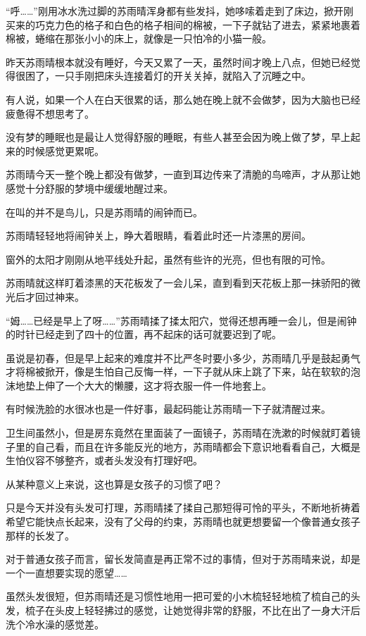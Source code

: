 “呼……”刚用冰水洗过脚的苏雨晴浑身都有些发抖，她哆嗦着走到了床边，掀开刚买来的巧克力色的格子和白色的格子相间的棉被，一下子就钻了进去，紧紧地裹着棉被，蜷缩在那张小小的床上，就像是一只怕冷的小猫一般。

昨天苏雨晴根本就没有睡好，今天又累了一天，虽然时间才晚上八点，但她已经觉得很困了，一只手刚把床头连接着灯的开关关掉，就陷入了沉睡之中。

有人说，如果一个人在白天很累的话，那么她在晚上就不会做梦，因为大脑也已经疲惫得不想思考了。

没有梦的睡眠也是最让人觉得舒服的睡眠，有些人甚至会因为晚上做了梦，早上起来的时候感觉更累呢。

苏雨晴今天一整个晚上都没有做梦，一直到耳边传来了清脆的鸟啼声，才从那让她感觉十分舒服的梦境中缓缓地醒过来。

在叫的并不是鸟儿，只是苏雨晴的闹钟而已。

苏雨晴轻轻地将闹钟关上，睁大着眼睛，看着此时还一片漆黑的房间。

窗外的太阳才刚刚从地平线处升起，虽然有些许的光亮，但也有限的可怜。

苏雨晴就这样盯着漆黑的天花板发了一会儿呆，直到看到天花板上那一抹骄阳的微光后才回过神来。

“姆……已经是早上了呀……”苏雨晴揉了揉太阳穴，觉得还想再睡一会儿，但是闹钟的时针已经走到了四十的位置，再不起床的话可就要迟到了呢。

虽说是初春，但是早上起来的难度并不比严冬时要小多少，苏雨晴几乎是鼓起勇气才将棉被掀开，像是生怕自己反悔一样，一下子就从床上跳了下来，站在软软的泡沫地垫上伸了一个大大的懒腰，这才将衣服一件一件地套上。

有时候洗脸的水很冰也是一件好事，最起码能让苏雨晴一下子就清醒过来。

卫生间虽然小，但是房东竟然在里面装了一面镜子，苏雨晴在洗漱的时候就盯着镜子里的自己看，而且在许多能反光的地方，苏雨晴都会下意识地看看自己，大概是生怕仪容不够整齐，或者头发没有打理好吧。

从某种意义上来说，这也算是女孩子的习惯了吧？

只是今天并没有头发可打理，苏雨晴揉了揉自己那短得可怜的平头，不断地祈祷着希望它能快点长起来，没有了父母的约束，苏雨晴也就更想要留一个像普通女孩子那样的长发了。

对于普通女孩子而言，留长发简直是再正常不过的事情，但对于苏雨晴来说，却是一个一直想要实现的愿望……

虽然头发很短，但苏雨晴还是习惯性地用一把可爱的小木梳轻轻地梳了梳自己的头发，梳子在头皮上轻轻拂过的感觉，让她觉得非常的舒服，不比在出了一身大汗后洗个冷水澡的感觉差。

